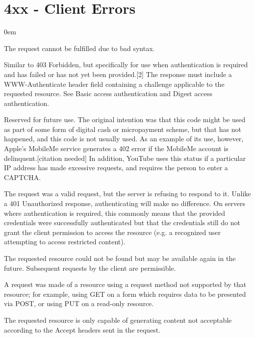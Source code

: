 \section{4xx - Client Errors}
\begin{description}\itemsep0em
	\item [400 - Bad Request] The request cannot be fulfilled due to bad syntax.
	
	\item [401 - Unauthorized] Similar to 403 Forbidden, but specifically for use when authentication is required and has failed or has not yet been provided.[2] The response must include a WWW-Authenticate header field containing a challenge applicable to the requested resource. See Basic access authentication and Digest access authentication.

	\item [402 - Payment required] Reserved for future use. The original intention was that this code might be used as part of some form of digital cash or micropayment scheme, but that has not happened, and this code is not usually used. As an example of its use, however, Apple's MobileMe service generates a 402 error if the MobileMe account is delinquent.[citation needed] In addition, YouTube uses this status if a particular IP address has made excessive requests, and requires the person to enter a CAPTCHA.

	\item [403 - Forbidden] The request was a valid request, but the server is refusing to respond to it. Unlike a 401 Unauthorized response, authenticating will make no difference. On servers where authentication is required, this commonly means that the provided credentials were successfully authenticated but that the credentials still do not grant the client permission to access the resource (e.g. a recognized user attempting to access restricted content).

	\item [404 - Not found] The requested resource could not be found but may be available again in the future. Subsequent requests by the client are permissible.

	\item [405 - Method Not Allowed] A request was made of a resource using a request method not supported by that resource; for example, using GET on a form which requires data to be presented via POST, or using PUT on a read-only resource.

	\item [406 - Not Acceptable] The requested resource is only capable of generating content not acceptable according to the Accept headers sent in the request.


\end{description}
